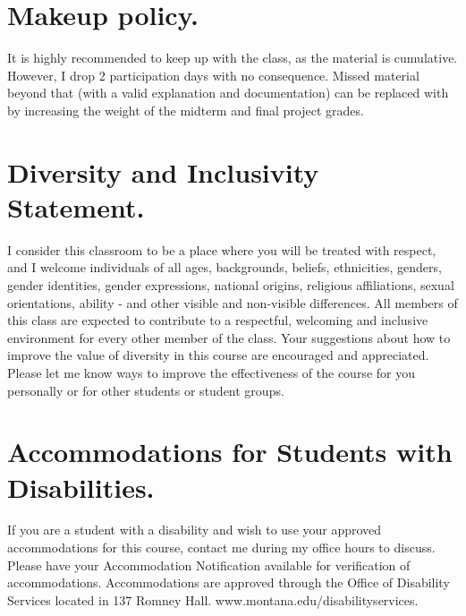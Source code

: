 \documentclass[letterpaper]{inzane_syllabus} %
\begin{document}
\vspace{0.3cm}
\section{Makeup policy.}  It is highly recommended to keep up with the class, as the material is cumulative.  However, I drop 2 participation days with no consequence. Missed material beyond that (with a valid explanation and documentation) can be replaced with by increasing the weight of the midterm and final project grades. 

\vspace{0.3cm}
%
%
%


\vspace{0.3cm}
\section{Diversity and Inclusivity Statement.} I consider this classroom to be a place where you will be treated with respect, and I welcome individuals of all ages, backgrounds, beliefs, ethnicities, genders, gender identities, gender expressions, national origins, religious affiliations, sexual orientations, ability - and other visible and non-visible differences. All members of this class are expected to contribute to a respectful, welcoming and inclusive environment for every other member of the class.  Your suggestions about how to improve the value of diversity in this course are encouraged and appreciated. Please let me know ways to improve the effectiveness of the course for you personally or for other students or student groups.
 
\vspace{0.3cm}
\section{Accommodations for Students with Disabilities.} If you are a student with a disability and wish to use your approved accommodations for this course, contact me during my office hours to discuss. Please have your Accommodation Notification available for verification of accommodations. Accommodations are approved through the Office of Disability Services located in 137 Romney Hall.  www.montana.edu/disabilityservices.
\end{document}
